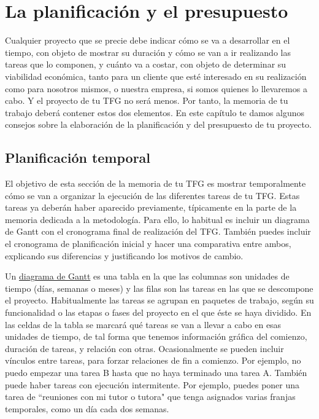 \chapter{La planificación y el presupuesto}
\label{cap:PlanificacionPresupuesto}

Cualquier proyecto que se precie debe indicar cómo se va a desarrollar en el tiempo, con objeto de mostrar su duración y cómo se van a ir realizando las tareas que lo componen, y cuánto va a costar, con objeto de determinar su viabilidad económica, tanto para un cliente que esté interesado en su realización como para nosotros mismos, o nuestra empresa, si somos quienes lo llevaremos a cabo. Y el proyecto de tu TFG no será menos. Por tanto, la memoria de tu trabajo deberá contener estos dos elementos. En este capítulo te damos algunos consejos sobre la elaboración de la planificación y del presupuesto de tu proyecto.


\section{Planificación temporal}
El objetivo de esta sección de la memoria de tu TFG es mostrar temporalmente cómo se van a organizar la ejecución de las diferentes tareas de tu TFG. Estas tareas ya deberán haber aparecido previamente, típicamente en la parte de la memoria dedicada a la metodología. Para ello, lo habitual es incluir un diagrama de Gantt con el cronograma final de realización del TFG. También puedes incluir el cronograma de planificación inicial y hacer una comparativa entre ambos, explicando sus diferencias y justificando los motivos de cambio.

Un \href{https://blog.ganttpro.com/en/ultimate-guide-gantt-charts/}{diagrama de Gantt} es una tabla en la que las columnas son unidades de tiempo (días, semanas o meses) y las filas son las tareas en las que se descompone el proyecto. Habitualmente las tareas se agrupan en paquetes de trabajo, según su funcionalidad o las etapas o fases del proyecto en el que éste se haya dividido. En las celdas de la tabla se marcará qué tareas se van a llevar a cabo en esas unidades de tiempo, de tal forma que tenemos información gráfica del comienzo, duración de tareas, y relación con otras. Ocasionalmente se pueden incluir vínculos entre tareas, para forzar relaciones de fin a comienzo. Por ejemplo, no puedo empezar una tarea B hasta que no haya terminado una tarea A. También puede haber tareas con ejecución intermitente. Por ejemplo, puedes poner una tarea de ``reuniones con mi tutor o tutora" que tenga asignados varias franjas temporales, como un día cada dos semanas.

